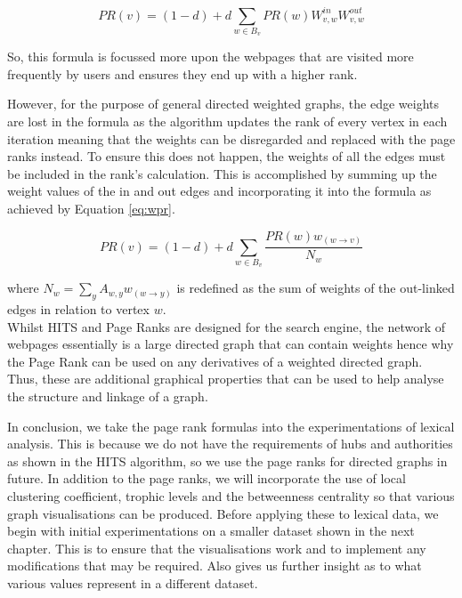 \begin{equation}\label{eq:proverall}
PR(v) = (1 - d) + d\sum_{w \in B_v}PR(w)W^{in}_{v,w}W^{out}_{v,w}
\end{equation}

So, this formula is focussed more upon the webpages that are visited more frequently by users and ensures they end up with a higher rank. 

However, for the purpose of general directed weighted graphs, the edge weights are lost in the formula as the algorithm updates the rank of every vertex in each iteration meaning that the weights can be disregarded and replaced with the page ranks instead. To ensure this does not happen, the weights of all the edges must be included in the rank's calculation. This is accomplished by summing up the weight values of the in and out edges and incorporating it into the formula as achieved by Equation \ref{eq:wpr}.

\begin{equation} \label{eq:wpr}
PR(v) = (1-d) + d\sum_{w \in B_v}\frac{PR(w)w_{(w \rightarrow v)}}{N_w}
\end{equation}

where $N_w = \sum_y{A_{w,y}w_{(w \rightarrow y)}}$ is redefined as the sum of weights of the out-linked edges in relation to vertex $w$.
\\

Whilst HITS and Page Ranks are designed for the search engine, the network of webpages essentially is a large directed graph that can contain weights hence why the Page Rank can be used on any derivatives of a weighted directed graph. Thus, these are additional graphical properties that can be used to help analyse the structure and linkage of a graph. 

In conclusion, we take the page rank formulas into the experimentations of lexical analysis. This is because we do not have the requirements of hubs and authorities as shown in the HITS algorithm, so we use the page ranks for directed graphs in future. In addition to the page ranks, we will incorporate the use of local clustering coefficient, trophic levels and the betweenness centrality so that various graph visualisations can be produced. Before applying these to lexical data, we begin with initial experimentations on a smaller dataset shown in the next chapter. This is to ensure that the visualisations work and to implement any modifications that may be required. Also gives us further insight as to what various values represent in a different dataset.
